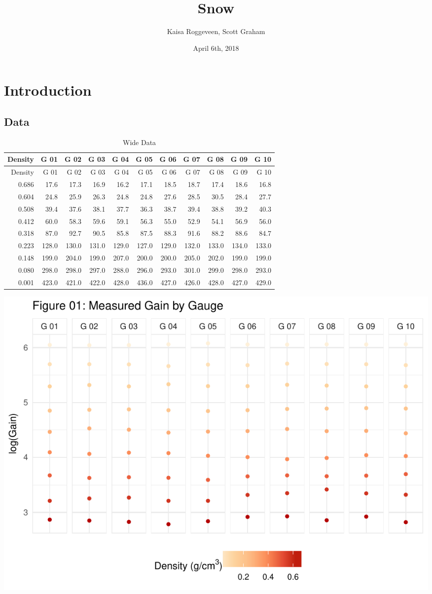 \documentclass[]{article}
\title{Snow}
\author{Kaisa Roggeveen, Scott Graham}
\date{April 6th, 2018}
\begin{document}
\maketitle

\section{Introduction}\label{introduction}

\subsection{Data}\label{data}

\begin{longtable}[]{@{}rrrrrrrrrrr@{}}
\caption{Wide Data}\tabularnewline
\toprule
Density & G 01 & G 02 & G 03 & G 04 & G 05 & G 06 & G 07 & G 08 & G 09 &
G 10\tabularnewline
\midrule
\endfirsthead
\toprule
Density & G 01 & G 02 & G 03 & G 04 & G 05 & G 06 & G 07 & G 08 & G 09 &
G 10\tabularnewline
\midrule
\endhead
0.686 & 17.6 & 17.3 & 16.9 & 16.2 & 17.1 & 18.5 & 18.7 & 17.4 & 18.6 &
16.8\tabularnewline
0.604 & 24.8 & 25.9 & 26.3 & 24.8 & 24.8 & 27.6 & 28.5 & 30.5 & 28.4 &
27.7\tabularnewline
0.508 & 39.4 & 37.6 & 38.1 & 37.7 & 36.3 & 38.7 & 39.4 & 38.8 & 39.2 &
40.3\tabularnewline
0.412 & 60.0 & 58.3 & 59.6 & 59.1 & 56.3 & 55.0 & 52.9 & 54.1 & 56.9 &
56.0\tabularnewline
0.318 & 87.0 & 92.7 & 90.5 & 85.8 & 87.5 & 88.3 & 91.6 & 88.2 & 88.6 &
84.7\tabularnewline
0.223 & 128.0 & 130.0 & 131.0 & 129.0 & 127.0 & 129.0 & 132.0 & 133.0 &
134.0 & 133.0\tabularnewline
0.148 & 199.0 & 204.0 & 199.0 & 207.0 & 200.0 & 200.0 & 205.0 & 202.0 &
199.0 & 199.0\tabularnewline
0.080 & 298.0 & 298.0 & 297.0 & 288.0 & 296.0 & 293.0 & 301.0 & 299.0 &
298.0 & 293.0\tabularnewline
0.001 & 423.0 & 421.0 & 422.0 & 428.0 & 436.0 & 427.0 & 426.0 & 428.0 &
427.0 & 429.0\tabularnewline
\bottomrule
\end{longtable}

\includegraphics{Project_05_files/figure-latex/Measured Gain by Gauge-1.pdf}
\end{document}
